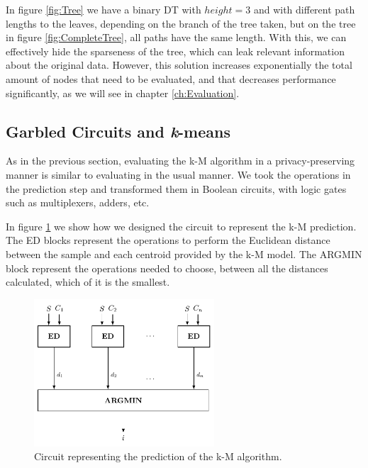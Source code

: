 In figure \ref{fig:Tree} we have a binary \ac{DT} with $height=3$ and with different path lengths to the leaves, depending on the branch of the tree taken, but on the tree in figure \ref{fig:CompleteTree}, all paths have the same length. With this, we can effectively hide the sparseness of the tree, which can leak relevant information about the original data. However, this solution increases exponentially the total amount of nodes that need to be evaluated, and that decreases performance significantly, as we will see in chapter \ref{ch:Evaluation}.
                


\subsection{Garbled Circuits and \textit{k}-means}
\label{ssec:GCandk-M}



As in the previous section, evaluating the \ac{k-M} algorithm in a privacy-preserving manner is similar to evaluating in the usual manner. We took the operations in the prediction step and transformed them in Boolean circuits, with logic gates such as multiplexers, adders, etc.

In figure \ref{fig:kmeans} we show how we designed the circuit to represent the \ac{k-M} prediction. The ED blocks represent the operations to perform the Euclidean distance between the sample and each centroid provided by the \ac{k-M} model. The ARGMIN block represent the operations needed to choose, between all the distances calculated, which of it is the smallest.


\begin{figure}[!ht]
  \centering
  \includegraphics[width=0.60\textwidth]{images/k-means.pdf}
  \caption{Circuit representing the prediction of the \ac{k-M} algorithm.}
  \label{fig:kmeans}
\end{figure}


